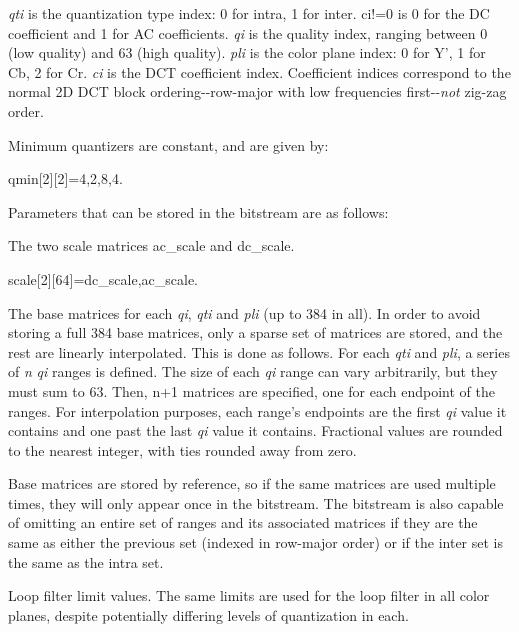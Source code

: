 {\itshape qti\/} is the quantization type index: 0 for intra, 1 for inter. {\ttfamily ci!=0} is 0 for the DC coefficient and 1 for AC coefficients. {\itshape qi\/} is the quality index, ranging between 0 (low quality) and 63 (high quality). {\itshape pli\/} is the color plane index: 0 for Y', 1 for Cb, 2 for Cr. {\itshape ci\/} is the DCT coefficient index. Coefficient indices correspond to the normal 2D DCT block ordering-\/-\/row-\/major with low frequencies first-\/-\/{\itshape not\/} zig-\/zag order.

Minimum quantizers are constant, and are given by: 
\begin{DoxyCode}
   qmin[2][2]={{4,2},{8,4}}.
\end{DoxyCode}


Parameters that can be stored in the bitstream are as follows:
\begin{DoxyItemize}
\item The two scale matrices ac\_\-scale and dc\_\-scale. 
\begin{DoxyCode}
      scale[2][64]={dc_scale,ac_scale}.
\end{DoxyCode}

\item The base matrices for each {\itshape qi\/}, {\itshape qti\/} and {\itshape pli\/} (up to 384 in all). In order to avoid storing a full 384 base matrices, only a sparse set of matrices are stored, and the rest are linearly interpolated. This is done as follows. For each {\itshape qti\/} and {\itshape pli\/}, a series of {\itshape n\/} {\itshape qi\/} ranges is defined. The size of each {\itshape qi\/} range can vary arbitrarily, but they must sum to 63. Then, {\ttfamily n+1} matrices are specified, one for each endpoint of the ranges. For interpolation purposes, each range's endpoints are the first {\itshape qi\/} value it contains and one past the last {\itshape qi\/} value it contains. Fractional values are rounded to the nearest integer, with ties rounded away from zero.
\end{DoxyItemize}

Base matrices are stored by reference, so if the same matrices are used multiple times, they will only appear once in the bitstream. The bitstream is also capable of omitting an entire set of ranges and its associated matrices if they are the same as either the previous set (indexed in row-\/major order) or if the inter set is the same as the intra set.


\begin{DoxyItemize}
\item Loop filter limit values. The same limits are used for the loop filter in all color planes, despite potentially differing levels of quantization in each.
\end{DoxyItemize}

